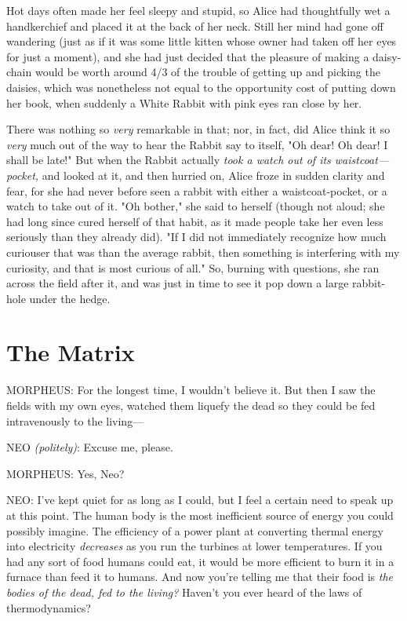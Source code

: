 Hot days often made her feel sleepy and stupid, so Alice had thoughtfully wet a
handkerchief and placed it at the back of her neck. Still her mind had gone off
wandering (just as if it was some little kitten whose owner had taken off her
eyes for just a moment), and she had just decided that the pleasure of making a
daisy-chain would be worth around 4/3 of the trouble of getting up and picking
the daisies, which was nonetheless not equal to the opportunity cost of putting
down her book, when suddenly a White Rabbit with pink eyes ran close by her.

There was nothing so \emph{very} remarkable in that; nor, in fact, did Alice
think it so \emph{very} much out of the way to hear the Rabbit say to itself,
"Oh dear! Oh dear! I shall be late!" But when the Rabbit actually \emph{took a
watch out of its waistcoat---pocket,} and looked at it, and then hurried on,
Alice froze in sudden clarity and fear, for she had never before seen a rabbit
with either a waistcoat-pocket, or a watch to take out of it. "Oh bother," she
said to herself (though not aloud; she had long since cured herself of that
habit, as it made people take her even less seriously than they already did).
"If I did not immediately recognize how much curiouser that was than the
average rabbit, then something is interfering with my curiosity, and that is
most curious of all." So, burning with questions, she ran across the field
after it, and was just in time to see it pop down a large rabbit-hole under the
hedge.
\section{The Matrix}
MORPHEUS: For the longest time, I wouldn't believe it. But then I saw the
fields with my own eyes, watched them liquefy the dead so they could be fed
intravenously to the living---

NEO \emph{(politely)}: Excuse me, please.

MORPHEUS: Yes, Neo?

NEO: I've kept quiet for as long as I could, but I feel a certain need to speak
up at this point. The human body is the most inefficient source of energy you
could possibly imagine. The efficiency of a power plant at converting thermal
energy into electricity \emph{decreases} as you run the turbines at lower
temperatures. If you had any sort of food humans could eat, it would be more
efficient to burn it in a furnace than feed it to humans. And now you're
telling me that their food is \emph{the bodies of the dead, fed to the living?}
Haven't you ever heard of the laws of thermodynamics?

